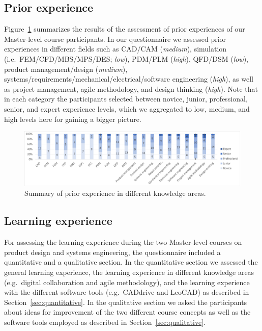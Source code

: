\documentclass{PDS}
\begin{document}
\subsection{Prior experience}
\label{sec:prior}

Figure~\ref{fig:before} summarizes the results of the assessment of prior experiences of our Master-level course participants.
In our questionnaire we assessed prior experiences in different fields such as CAD/CAM (\textit{medium}), simulation (i.e.\ FEM/CFD/MBS/MPS/DES; \textit{low}), PDM/PLM (\textit{high}), QFD/DSM (\textit{low}), product management/design (\textit{medium}), systems/requirements/mechanical/electrical/software engineering (\textit{high}), as well as project management, agile methodology, and design thinking (\textit{high}).
Note that in each category the participants selected between novice, junior, professional, senior, and expert experience levels, which we aggregated to low, medium, and high levels here for gaining a bigger picture.

\begin{figure}[htbp]
    \centering
    \includegraphics[width=\textwidth]{./diagrams/before.png}
    \caption{Summary of prior experience in different knowledge areas.}
    \label{fig:before}
\end{figure}

\subsection{Learning experience}
\label{sec:learning}

For assessing the learning experience during the two Master-level courses on product design and systems engineering, the questionnaire included a quantitative and a qualitative section.
In the quantitative section we assessed the general learning experience, the learning experience in different knowledge areas (e.g.\ digital collaboration and agile methodology), and the learning experience with the different software tools (e.g.\ CADdrive and LeoCAD) as described in Section~\ref{sec:quantitative}.
In the qualitative section we asked the participants about ideas for improvement of the two different course concepts as well as the software tools employed as described in Section~\ref{sec:qualitative}.
\end{document}
